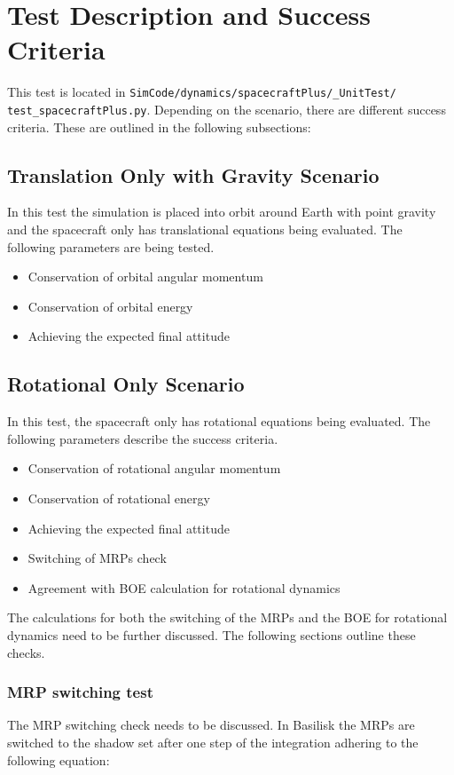 \section{Test Description and Success Criteria}
This test is located in \texttt{SimCode/dynamics/spacecraftPlus/\_UnitTest/\newline
test\_spacecraftPlus.py}. Depending on the scenario, there are different success criteria. These are outlined in the following subsections:
\subsection{Translation Only with Gravity Scenario}
In this test the simulation is placed into orbit around Earth with point gravity and the spacecraft only has translational equations being evaluated. The following parameters are being tested. 
\begin{itemize}
	\item Conservation of orbital angular momentum
	\item Conservation of orbital energy
	\item Achieving the expected final attitude
\end{itemize}

\subsection{Rotational Only Scenario}
In this test, the spacecraft only has rotational equations being evaluated. The following parameters describe the success criteria.
\begin{itemize}
\item Conservation of rotational angular momentum
\item Conservation of rotational energy
\item Achieving the expected final attitude
\item Switching of MRPs check
\item Agreement with BOE calculation for rotational dynamics
\end{itemize}
The calculations for both the switching of the MRPs and the BOE for rotational dynamics need to be further discussed. The following sections outline these checks.

\subsubsection{MRP switching test} 
The MRP switching check needs to be discussed. In Basilisk the MRPs are switched to the shadow set after one step of the integration adhering to the following equation\cite{schaub}:

